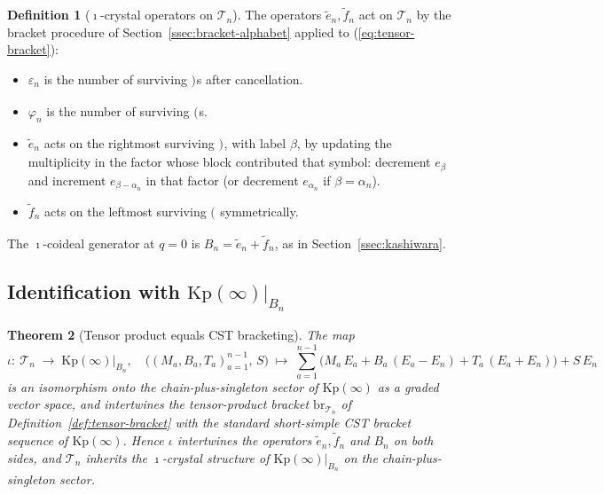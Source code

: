 \documentclass[11pt]{article}
\newtheorem{theorem}{Theorem}[section]
\theoremstyle{definition}
\newtheorem{definition}[theorem]{Definition}
\theoremstyle{remark}
\newcommand{\Kp}{\mathrm{Kp}}
\newcommand{\TT}{\mathcal{T}}
\newcommand{\br}{\mathrm{br}}
\newcommand{\labr}[1]{{)}_{#1}}
\newcommand{\labl}[1]{{(}_{#1}}
\begin{document}
\begin{definition}[$\imath$-crystal operators on $\TT_n$]\label{def:tensor-icrystal-ops}
The operators $\tilde e_n, \tilde f_n$ act on $\TT_n$ by the bracket procedure of
Section~\ref{ssec:bracket-alphabet} applied to (\ref{eq:tensor-bracket}):
\begin{itemize}[leftmargin=2em]
  \item $\varepsilon_n$ is the number of surviving $\labr{}$s after cancellation.
  \item $\varphi_n$ is the number of surviving $\labl{}$s.
  \item $\tilde e_n$ acts on the rightmost surviving $\labr{}$, with label $\beta$,
    by updating the multiplicity in the factor whose block contributed that symbol:
    decrement $e_\beta$ and increment $e_{\beta - \alpha_n}$ in that factor (or
    decrement $e_{\alpha_n}$ if $\beta = \alpha_n$).
  \item $\tilde f_n$ acts on the leftmost surviving $\labl{}$ symmetrically.
\end{itemize}
The $\imath$-coideal generator at $q = 0$ is $B_n = \tilde e_n + \tilde f_n$, as in
Section~\ref{ssec:kashiwara}.
\end{definition}

\subsection{Identification with $\Kp(\infty)|_{B_n}$}\label{ssec:tensor-identification}

\begin{theorem}[Tensor product equals CST bracketing]\label{thm:phaseB-identification}
The map
\begin{equation}\label{eq:phaseB-iota}
\iota:\ \TT_n \;\longrightarrow\; \Kp(\infty)\big|_{B_n},
\quad
\bigl((M_a, B_a, T_a)_{a=1}^{n-1},\, S\bigr) \;\longmapsto\;
\sum_{a=1}^{n-1} \bigl(M_a\, E_a + B_a\, (E_a - E_n) + T_a\, (E_a + E_n)\bigr) + S\, E_n
\end{equation}
is an isomorphism onto the chain-plus-singleton sector of $\Kp(\infty)$ as a
graded vector space, and intertwines the tensor-product bracket $\br_{\TT_n}$ of
Definition~\ref{def:tensor-bracket} with the standard short-simple CST bracket
sequence of $\Kp(\infty)$. Hence $\iota$ intertwines the operators $\tilde e_n,
\tilde f_n$ and $B_n$ on both sides, and $\TT_n$ inherits the $\imath$-crystal
structure of $\Kp(\infty)|_{B_n}$ on the chain-plus-singleton sector.
\end{theorem}
\end{document}
